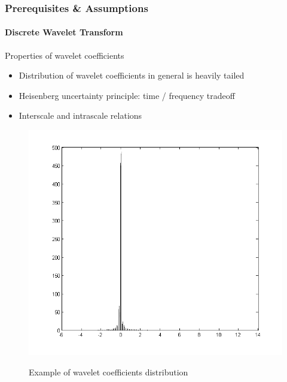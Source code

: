 \documentclass[12pt]{beamer}
\begin{document}
\begin{frame}
  \frametitle{Prerequisites \& Assumptions}
  \framesubtitle{Discrete Wavelet Transform}
  \begin{block}{Properties of wavelet coefficients}
  \begin{itemize}
    \item Distribution of wavelet coefficients in general is heavily tailed
    \item Heisenberg uncertainty principle: time / frequency tradeoff
    \item Interscale and intrascale relations
  \end{itemize}
  \end{block}
  \begin{figure}[H]
  \centering
  \includegraphics[scale=0.15]{../figs/theory/hist_wavelet_coefs}
  \label{fig:hist_wavelet_coefs}
  \caption{Example of wavelet coefficients distribution}
  \end{figure}
\end{frame}
\end{document}
